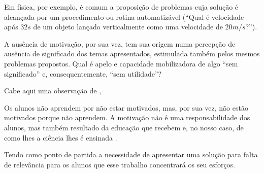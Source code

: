 Em física, por exemplo, é comum a proposição de problemas cuja solução é alcançada por um procedimento ou rotina automatizável (``Qual é velocidade após $32s$ de um objeto lançado verticalmente como uma velocidade de $20m/s$?''). 

A ausência de motivação, por sua vez, tem sua origem numa percepção de ausência de significado dos temas apresentados, estimulada também pelos mesmos problemas propostos. Qual é apelo e capacidade mobilizadora de algo ``sem significado'' e, consequentemente, ``sem utilidade''? 

Cabe aqui uma observação de ,

\begin{citacao}
Os alunos não aprendem por não estar motivados, mas, por sua vez, não estão motivados porque não aprendem. A motivação não é uma responsabilidade dos alunos, mas também resultado da educação que recebem e, no nosso caso, de como lhes a ciência lhes é ensinada \cite{Pozo}.
\end{citacao}



Tendo como ponto de partida a necessidade de apresentar uma solução para falta de relevância para os alunos que esse trabalho concentrará os seu esforços.





















